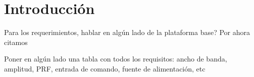 \chapter{Introducción}

Para los requerimientos, hablar en algún lado de la plataforma base? Por ahora
citamos \cite{altieri2017}

Poner en algún lado una tabla con todos los requisitos: ancho de banda, amplitud, PRF, entrada de comando, fuente de alimentación, etc
